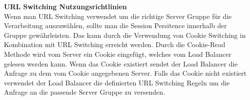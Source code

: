 \textbf{URL Switching Nutzungsrichtlinien} \\

Wenn man URL Switching verwendet um die richtige Server Gruppe für die Verarbeitung auszuwählen, sollte man die Session Persitence innerhalb der Gruppe gewährleisten. Das kann durch die Verwendung von Cookie Switching in Kombination mit URL Switching erreicht werden. Durch die Cookie-Read Methode wird vom Server ein Cookie eingefügt, welches vom Load Balancer gelesen werden kann. Wenn das Cookie existiert sendet der Load Balancer die Anfrage zu dem vom Cookie angegebenen Server. Falls das Cookie nicht existiert verwendet der Load Balancer die definierten URL Switching Regeln um die Anfrage an die passende Server Gruppe zu versenden. \cite{LoadBalancing2}


